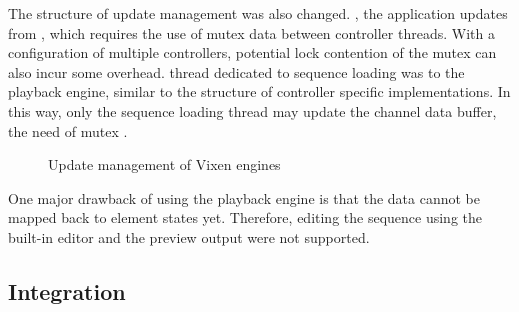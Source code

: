 The structure of update management was also changed. , the application updates  from , which requires the use of mutex  data  between controller threads. With a configuration  of multiple controllers, potential lock contention of the mutex can also incur some overhead.  thread dedicated to sequence loading was  to the playback engine, similar to the structure of controller specific implementations. In this way, only the sequence loading thread may update the channel data buffer,  the need of mutex .

\begin{figure}[t]
  \centering
  \hfil
  \caption{\footnotesize Update management of Vixen engines}
  \label{fig:update}
\end{figure}

One major drawback of using the playback engine is that the  data cannot be mapped back to element states yet. Therefore, editing the  sequence using the built-in editor and the preview output were not supported.

\subsection{Integration}

